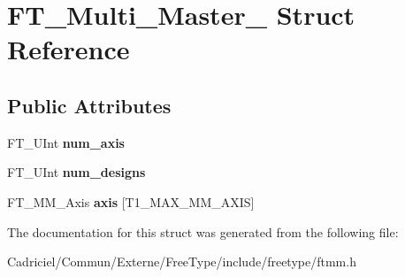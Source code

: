 \hypertarget{struct_f_t___multi___master__}{}\section{F\+T\+\_\+\+Multi\+\_\+\+Master\+\_\+ Struct Reference}
\label{struct_f_t___multi___master__}
\subsection*{Public Attributes}
\begin{DoxyCompactItemize}
\item 
F\+T\+\_\+\+U\+Int {\bfseries num\+\_\+axis}\hypertarget{struct_f_t___multi___master___a90a0ace4e40b91912259ad52fc86fb6f}{}\label{struct_f_t___multi___master___a90a0ace4e40b91912259ad52fc86fb6f}

\item 
F\+T\+\_\+\+U\+Int {\bfseries num\+\_\+designs}\hypertarget{struct_f_t___multi___master___a78b797ee560f4b00795a7dce9656178d}{}\label{struct_f_t___multi___master___a78b797ee560f4b00795a7dce9656178d}

\item 
F\+T\+\_\+\+M\+M\+\_\+\+Axis {\bfseries axis} \mbox{[}T1\+\_\+\+M\+A\+X\+\_\+\+M\+M\+\_\+\+A\+X\+IS\mbox{]}\hypertarget{struct_f_t___multi___master___a1eb062ff3b5ac245ab9421a46b349818}{}\label{struct_f_t___multi___master___a1eb062ff3b5ac245ab9421a46b349818}

\end{DoxyCompactItemize}


The documentation for this struct was generated from the following file\+:\begin{DoxyCompactItemize}
\item 
Cadriciel/\+Commun/\+Externe/\+Free\+Type/include/freetype/ftmm.\+h\end{DoxyCompactItemize}
